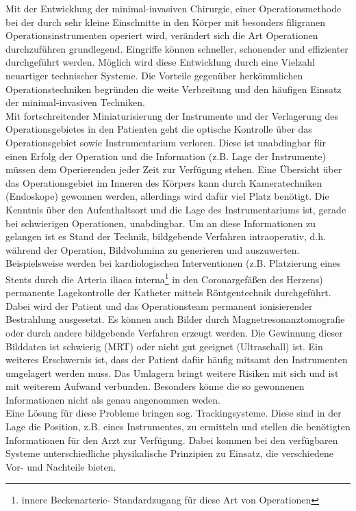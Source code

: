 Mit der Entwicklung der minimal-invasiven Chirurgie, einer Operationsmethode bei der durch sehr kleine Einschnitte in den Körper mit besonders filigranen Operationsinstrumenten operiert wird, verändert sich die Art Operationen durchzuführen grundlegend. Eingriffe können schneller, schonender und effizienter durchgeführt werden. Möglich wird diese Entwicklung durch eine Vielzahl neuartiger technischer Systeme. Die Vorteile gegenüber herkömmlichen Operationstechniken begründen die weite Verbreitung und den häufigen Einsatz der minimal-invasiven Techniken.\\
Mit fortschreitender Miniaturisierung der Instrumente und der Verlagerung des Operationsgebietes in den Patienten geht die optische Kontrolle über das Operationsgebiet sowie Instrumentarium verloren. Diese ist unabdingbar für einen Erfolg der Operation und die Information (z.B. Lage der Instrumente) müssen dem Operierenden jeder Zeit zur Verfügung stehen. Eine Übersicht über das Operationsgebiet im Inneren des Körpers kann durch Kameratechniken (Endoskope) gewonnen werden, allerdings wird dafür viel Platz benötigt. Die Kenntnis über den Aufenthaltsort und die Lage des Instrumentariums ist, gerade bei schwierigen Operationen, unabdingbar. Um an diese Informationen zu gelangen ist es Stand der Technik, bildgebende Verfahren intraoperativ, d.h. während der Operation, Bildvolumina zu generieren und auszuwerten.\\
Beispielsweise werden bei kardiologischen Interventionen (z.B. Platzierung eines Stents durch die Arteria iliaca interna\footnote {innere Beckenarterie- Standardzugang für diese Art von Operationen} in den Coronargefäßen des Herzens) permanente Lagekontrolle der Katheter mittels Röntgentechnik durchgeführt. Dabei wird der Patient und das Operationsteam permanent ionisierender Bestrahlung ausgesetzt. Es können auch Bilder durch Magnetresonanztomografie oder durch andere bildgebende Verfahren erzeugt werden. Die Gewinnung dieser Bilddaten ist schwierig (MRT) oder nicht gut geeignet (Ultraschall) ist. Ein weiteres Erschwernis ist, dass der Patient dafür häufig mitsamt den Instrumenten umgelagert werden muss. Das Umlagern bringt weitere Risiken mit sich und ist mit weiterem Aufwand verbunden. Besonders könne die so gewonnenen Informationen nicht als genau angenommen weden.\\
Eine Lösung für diese Probleme bringen sog. Trackingsysteme. Diese sind in der Lage die Position, z.B. eines Instrumentes, zu ermitteln und stellen die benötigten Informationen für den Arzt zur Verfügung. Dabei kommen bei den verfügbaren Systeme unterschiedliche physikalische Prinzipien zu Einsatz, die verschiedene Vor- und Nachteile bieten.\\
